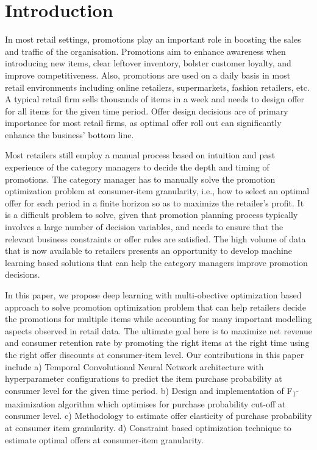 \section{Introduction}
In most retail settings, promotions play an important role in boosting the sales and traffic of the organisation.
Promotions aim to enhance awareness when introducing new items, clear leftover inventory, bolster customer loyalty, 
and improve competitiveness. Also, promotions are used on a daily basis in most retail environments including online retailers, 
supermarkets, fashion retailers, etc. A typical retail firm sells thousands of items in a week and needs to design offer 
for all items for the given time period. Offer design decisions are of primary importance for most retail firms, 
as optimal offer roll out can significantly enhance the business’ bottom line.

Most retailers still employ a manual process based on intuition and past experience of the category managers
to decide the depth and timing of promotions. The category manager has to manually solve the promotion optimization problem
at consumer-item granularity, i.e., how to select an optimal offer for each period in a finite horizon so as to maximize the 
retailer’s profit. It is a difficult problem to solve, given that promotion planning process typically 
involves a large number of decision variables, and needs to ensure that the relevant business constraints or offer rules
are satisfied. The high volume of data that is now available to retailers presents an opportunity to develop 
machine learning based solutions that can help the category managers improve promotion decisions.

In this paper, we propose deep learning with multi-obective optimization based approach to solve 
promotion optimization problem that can help retailers decide the promotions for multiple items while accounting 
for many important modelling aspects observed in retail data. The ultimate goal here is to maximize net revenue and
consumer retention rate by promoting the right items at the right time using the right offer discounts at 
consumer-item level. Our contributions in this paper include a) Temporal Convolutional Neural Network architecture
with hyperparameter configurations to predict the item purchase probability at consumer level for the given time period. 
b) Design and implementation of F\textsubscript{1}-maximization algorithm which optimises for purchase 
probability cut-off at consumer level. c) Methodology to estimate offer elasticity of purchase probability at consumer 
item granularity. d) Constraint based optimization technique to estimate optimal offers 
at consumer-item granularity.